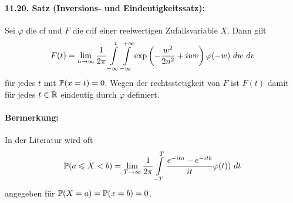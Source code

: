 \documentclass[11pt]{report}
\begin{document}
\paragraph{11.20. Satz (Inversions- und Eindeutigkeitssatz):} Sei $\varphi$ die cf und $F$ die cdf einer reelwertigen Zufallsvariable $X$. Dann gilt
$$F(t)=\lim_{n\to\infty}\dfrac{1}{2\pi}\int\displaylimits_{-\infty}^t\int\displaylimits_{-\infty}^{+\infty}\exp\left(-\dfrac{w^2}{2n^2}+iwv\right)\varphi(-w)\ dw\ dv$$
f\"ur jedes $t$ mit $\mathbb{P}(x=t)=0$. Wegen der rechtsstetigkeit von $F$ ist $F(t)$ damit f\"ur jedes $t\in\mathbb{R}$ eindeutig durch $\varphi$ definiert. 

\paragraph{Bermerkung:} In der Literatur wird oft 
$$\Pp(a\leq X<b)=\lim_{T\to\infty}\dfrac{1}{2\pi}\int\displaylimits_{-T}^T\dfrac{e^{-ita}-e^{-itb}}{it}\varphi(t))\ dt$$
angegeben f\"ur $\mathbb{P}(X=a)=\mathbb{P}(x=b)=0$.
\end{document}
